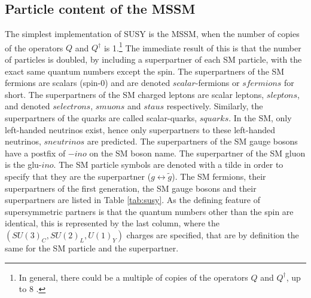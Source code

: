 \subsection*{Particle content of the MSSM}
\noindent\justify
The simplest implementation of SUSY is the MSSM, when the number of copies of the operators $Q$ and $Q^{\dagger}$ is 1.\footnote{In general, there could be a multiple of copies of the operators $Q$ and $Q^{\dagger}$, up to 8 \cite{Haag:1974qh,Coleman:1967ad}.}
The immediate result of this is that the number of particles is doubled, by including a superpartner of each SM particle, with the exact same quantum numbers except the spin. 
The superpartners of the SM fermions are scalars (spin-0) and are denoted $scalar$-fermions or $sfermions$ for short. 
The superpartners of the SM charged leptons are scalar leptons, $sleptons$, and denoted $selectrons$, $smuons$ and $staus$ respectively. 
Similarly, the superpartners of the quarks are called scalar-quarks, $squarks$. 
In the SM, only left-handed neutrinos exist, hence only superpartners to these left-handed neutrinos, $sneutrinos$ are predicted. 
The superpartners of the SM gauge bosons have a postfix of $-ino$ on the SM boson name. The superpartner of the SM gluon is the glu-$ino$. 
The SM particle symbols are denoted with a tilde in order to specify that they are the superpartner ($g\leftrightarrow\tilde{g}$). 
The SM fermions, their superpartners of the first generation, the SM gauge bosons and their superpartners are listed in Table \ref{tab:susy}.  
As the defining feature of supersymmetric partners is that the quantum numbers other than the spin are identical, this is represented by the last column, where the $(SU(3)_{C},SU(2)_{L},U(1)_{Y})$ charges are specified, that are by definition the same for the SM particle and the superpartner. 

